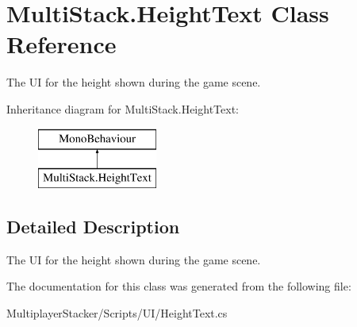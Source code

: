 \hypertarget{class_multi_stack_1_1_height_text}{}\section{Multi\+Stack.\+Height\+Text Class Reference}
\label{class_multi_stack_1_1_height_text}


The U\+I for the height shown during the game scene.  


Inheritance diagram for Multi\+Stack.\+Height\+Text\+:\begin{figure}[H]
\begin{center}
\leavevmode
\includegraphics[height=2.000000cm]{class_multi_stack_1_1_height_text}
\end{center}
\end{figure}


\subsection{Detailed Description}
The U\+I for the height shown during the game scene. 



The documentation for this class was generated from the following file\+:\begin{DoxyCompactItemize}
\item 
Multiplayer\+Stacker/\+Scripts/\+U\+I/Height\+Text.\+cs\end{DoxyCompactItemize}

